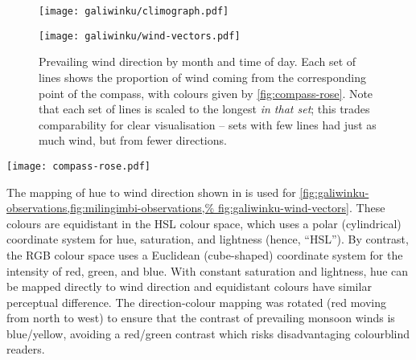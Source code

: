\begin{figure}[p]
    \centering
    \texttt{[image: galiwinku/climograph.pdf]}
    \caption[Monthly Climograph for Galiwinku]{
        Monthly summary of climate statistics at Galiwinku, showing the per-day
        mean for each month.  Rainfall (vertical bars), maximum temperature
        (solid line), minimum temperature (dashed line), and  dewpoint
        temperature (dotted line).  Dewpoint temperature is a measure of humidity.}
    \label{fig:galiwinku-climograph}
\vspace{1cm}
    \centering
    \texttt{[image: galiwinku/wind-vectors.pdf]}
    \caption[Monthly wind vector summary for Galiwinku]{
        Prevailing wind direction by month and time of day.  Each set of
        lines shows the proportion of wind coming from the corresponding
        point of the compass, with colours given by \cref{fig:compass-rose}.
        Note that each set of lines is scaled to the longest \textit{in
        that set}; this trades comparability for clear visualisation --
        sets with few lines had just as much wind, but from fewer directions.
        }
    \label{fig:galiwinku-wind-vectors}
\end{figure}

\begin{SCfigure}[][b]
    \texttt{[image: compass-rose.pdf]}
    \caption[Compass Rose mapping colour to wind direction]{
        The mapping of hue to wind direction used for
        \cref{fig:galiwinku-observations,fig:milingimbi-observations,%
        fig:galiwinku-wind-vectors}.  These colours are equidistant in
        the HSL colour space, with constant saturation and lightness.}
    \label{fig:compass-rose}
\end{SCfigure}

The mapping of hue to wind direction shown in  is
used for \cref{fig:galiwinku-observations,fig:milingimbi-observations,%
fig:galiwinku-wind-vectors}.  These colours are equidistant in the HSL colour space,
which uses a polar (cylindrical) coordinate system for hue, saturation,
and lightness (hence, ``HSL'').  By contrast, the RGB colour space uses
a Euclidean (cube-shaped) coordinate system for the intensity of red,
green, and blue.  With constant saturation and lightness,
hue can be mapped directly to wind direction and equidistant colours
have similar perceptual difference.
%
The direction-colour mapping was rotated (red moving from north to west)
to ensure that the contrast of prevailing monsoon winds is blue/yellow,
avoiding a red/green contrast which risks disadvantaging colourblind readers.

